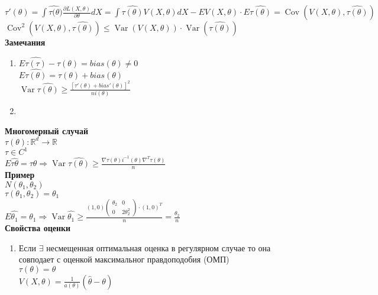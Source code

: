 \documentclass{article}
\newcommand\0{\mathbb{0}}
\DeclareMathOperator{\Var}{Var}
\DeclareMathOperator{\Cov}{Cov}
\newcommand\1{\mathbb{1}}
\begin{document}
$\tau'(\theta) = \displaystyle\int \widehat{\tau(\theta}) \frac{\partial L(X, \theta)}{\partial \theta} dX = \displaystyle\int \widehat{\tau(\theta)}V(X, \theta)dX - EV(X, \theta) \cdot E\widehat{\tau(\theta)} = \Cov(V(X, \theta), \widehat{\tau(\theta)})$\\
$\Cov^2(V(X, \theta), \widehat{\tau(\theta)}) \leq \Var(V(X, \theta)) \cdot \Var(\widehat{\tau(\theta)})$\\
\textbf{Замечания}
\begin{enumerate}
    \item $E \widehat{\tau(\tau)} - \tau(\theta)  =bias(\theta) \neq 0$\\
    $E\widehat{\tau(\theta)} = \tau(\theta) + bias(\theta)$\\
    $\Var\widehat{\tau(\theta)} \geq \frac{[\tau'(\theta) + bias'(\theta)]^2}{ni(\theta)}$
    \item 
\end{enumerate}
\textbf{Многомерный случай}\\
$\tau(\theta): \mathbb{R}^d \to \mathbb{R}$\\
$\tau \in C^1$\\
$E\widehat{\tau{\theta}} = \tau{\theta} \Rightarrow \Var\widehat{\tau(\theta)} \geq \frac{\nabla \tau(\theta)i^{-1}(\theta)\nabla^T\tau(\theta)}{n}$\\
\textbf{Пример}\\
$N(\theta_1, \theta_2)$\\
$\tau(\theta_1, \theta_2) = \theta_1$\\
$E\widehat{\theta_1} = \theta_1 \Rightarrow \Var\widehat{\theta_1} \geq \frac{(1, 0) \begin{pmatrix}
\theta_2 & 0\\
0 & 2\theta_2^2
\end{pmatrix} \cdot (1, 0)^T}{n} = \frac{\theta_2}{
n}$\\
\textbf{Свойства оценки}
\begin{enumerate}
    \item Если $\exists$ несмещенная оптимальная оценка в регулярном случае то она совподает с оценкой максимальног правдоподобия (ОМП)\\
    $\tau(\theta) = \theta$\\
    $V(X, \theta) = \frac{1}{a(\theta)}(\widehat{\theta} - \theta)$
\end{enumerate}
\end{document}
